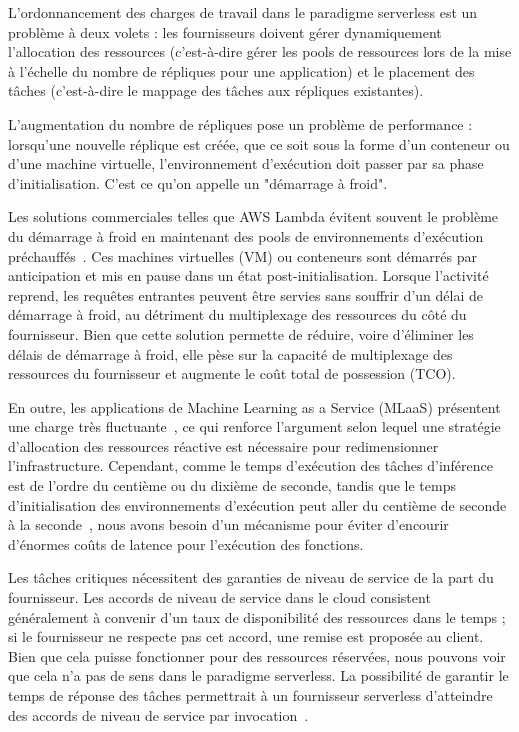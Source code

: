 L'ordonnancement des charges de travail dans le paradigme serverless est un problème à deux volets : les fournisseurs doivent gérer dynamiquement l'allocation des ressources (c'est-à-dire gérer les pools de ressources lors de la mise à l'échelle du nombre de répliques pour une application) et le placement des tâches (c'est-à-dire le mappage des tâches aux répliques existantes).

L'augmentation du nombre de répliques pose un problème de performance : lorsqu'une nouvelle réplique est créée, que ce soit sous la forme d'un conteneur ou d'une machine virtuelle, l'environnement d'exécution doit passer par sa phase d'initialisation. C'est ce qu'on appelle un "démarrage à froid".

Les solutions commerciales telles que AWS Lambda évitent souvent le problème du démarrage à froid en maintenant des pools de environnements d'exécution préchauffés~\cite{vahidiniaColdStartServerless2020}. Ces machines virtuelles (VM) ou conteneurs sont démarrés par anticipation et mis en pause dans un état post-initialisation. Lorsque l'activité reprend, les requêtes entrantes peuvent être servies sans souffrir d'un délai de démarrage à froid, au détriment du multiplexage des ressources du côté du fournisseur. Bien que cette solution permette de réduire, voire d'éliminer les délais de démarrage à froid, elle pèse sur la capacité de multiplexage des ressources du fournisseur et augmente le coût total de possession (TCO).

En outre, les applications de Machine Learning as a Service (MLaaS) présentent une charge très fluctuante~\cite{gujaratiSwayamDistributedAutoscaling2017}, ce qui renforce l'argument selon lequel une stratégie d'allocation des ressources réactive est nécessaire pour redimensionner l'infrastructure. Cependant, comme le temps d'exécution des tâches d'inférence est de l'ordre du centième ou du dixième de seconde, tandis que le temps d'initialisation des environnements d'exécution peut aller du centième de seconde à la seconde~\cite{mancoMyVMLighter2017}, nous avons besoin d'un mécanisme pour éviter d'encourir d'énormes coûts de latence pour l'exécution des fonctions.

Les tâches critiques nécessitent des garanties de niveau de service de la part du fournisseur. Les accords de niveau de service dans le cloud consistent généralement à convenir d'un taux de disponibilité des ressources dans le temps ; si le fournisseur ne respecte pas cet accord, une remise est proposée au client. Bien que cela puisse fonctionner pour des ressources réservées, nous pouvons voir que cela n'a pas de sens dans le paradigme serverless. La possibilité de garantir le temps de réponse des tâches permettrait à un fournisseur serverless d'atteindre des accords de niveau de service par invocation~\cite{zhangMArkExploitingCloud}.

